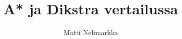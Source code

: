 \documentclass[10pt,a4paper]{article}
\begin{document}
\title{A* ja Dikstra vertailussa}
\author{Matti Nelimarkka}
\end{document}
